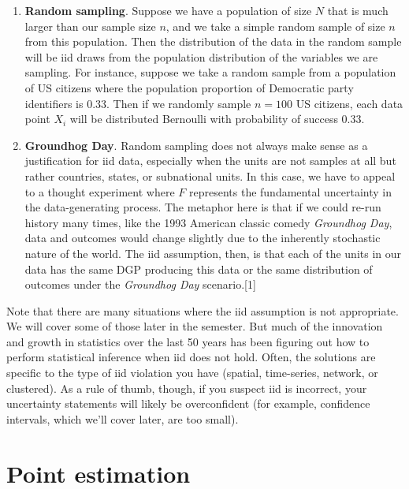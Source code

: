 \documentclass[
  letterpaper,
  DIV=11,
  numbers=noendperiod]{scrreprt}
\providecommand{\tightlist}{%
  \setlength{\itemsep}{0pt}\setlength{\parskip}{0pt}}\usepackage{longtable,booktabs,array}
\theoremstyle{definition}
\theoremstyle{plain}
\theoremstyle{definition}
\theoremstyle{remark}
\begin{document}
\begin{enumerate}
\def\labelenumi{\arabic{enumi}.}
\tightlist
\item
  \textbf{Random sampling}. Suppose we have a population of size \(N\)
  that is much larger than our sample size \(n\), and we take a simple
  random sample of size \(n\) from this population. Then the
  distribution of the data in the random sample will be iid draws from
  the population distribution of the variables we are sampling. For
  instance, suppose we take a random sample from a population of US
  citizens where the population proportion of Democratic party
  identifiers is 0.33. Then if we randomly sample \(n = 100\) US
  citizens, each data point \(X_i\) will be distributed Bernoulli with
  probability of success 0.33.
\item
  \textbf{Groundhog Day}. Random sampling does not always make sense as
  a justification for iid data, especially when the units are not
  samples at all but rather countries, states, or subnational units. In
  this case, we have to appeal to a thought experiment where \(F\)
  represents the fundamental uncertainty in the data-generating process.
  The metaphor here is that if we could re-run history many times, like
  the 1993 American classic comedy \emph{Groundhog Day}, data and
  outcomes would change slightly due to the inherently stochastic nature
  of the world. The iid assumption, then, is that each of the units in
  our data has the same DGP producing this data or the same distribution
  of outcomes under the \emph{Groundhog Day} scenario.{[}1{]}
\end{enumerate}

Note that there are many situations where the iid assumption is not
appropriate. We will cover some of those later in the semester. But much
of the innovation and growth in statistics over the last 50 years has
been figuring out how to perform statistical inference when iid does not
hold. Often, the solutions are specific to the type of iid violation you
have (spatial, time-series, network, or clustered). As a rule of thumb,
though, if you suspect iid is incorrect, your uncertainty statements
will likely be overconfident (for example, confidence intervals, which
we'll cover later, are too small).

\hypertarget{point-estimation}{%
\section{Point estimation}\label{point-estimation}}
\end{document}
